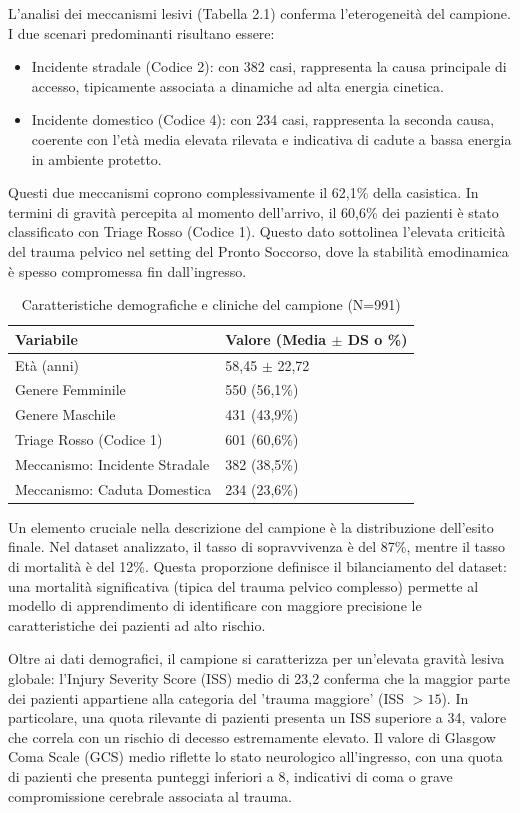\documentclass[11pt, oneside, noexaminfo]{sapthesis}   	%
\begin{document}
L’analisi dei meccanismi lesivi (Tabella 2.1) conferma l'eterogeneità del campione. I due scenari predominanti risultano essere:
\begin{itemize}
\item {Incidente stradale (Codice 2)}: con 382 casi, rappresenta la causa principale di accesso, tipicamente associata a dinamiche ad alta energia cinetica.
\item {Incidente domestico (Codice 4)}: con 234 casi, rappresenta la seconda causa, coerente con l'età media elevata rilevata e indicativa di cadute a bassa energia in ambiente protetto.
\end{itemize}

Questi due meccanismi coprono complessivamente il 62,1\% della casistica. In termini di gravità percepita al momento dell'arrivo, il 60,6\% dei pazienti è stato classificato con Triage Rosso (Codice 1). Questo dato sottolinea l'elevata criticità del trauma pelvico nel setting del Pronto Soccorso, dove la stabilità emodinamica è spesso compromessa fin dall'ingresso.

\begin{table}[h]
\centering
\caption{Caratteristiche demografiche e cliniche del campione (N=991)}
\begin{tabular}{ll}
\hline
\textbf{Variabile} & \textbf{Valore (Media $\pm$ DS o \%)} \\ \hline
Età (anni) & 58,45 $\pm$ 22,72 \\
Genere Femminile & 550 (56,1\%) \\
Genere Maschile & 431 (43,9\%) \\
Triage Rosso (Codice 1) & 601 (60,6\%) \\
Meccanismo: Incidente Stradale & 382 (38,5\%) \\
Meccanismo: Caduta Domestica & 234 (23,6\%) \\ \hline
\end{tabular}
\end{table}

Un elemento cruciale nella descrizione del campione è la distribuzione dell'esito finale. Nel dataset analizzato, il tasso di sopravvivenza è del 87\%, mentre il tasso di mortalità è del 12\%. Questa proporzione definisce il bilanciamento del dataset: una mortalità significativa (tipica del trauma pelvico complesso) permette al modello di apprendimento di identificare con maggiore precisione le caratteristiche dei pazienti ad alto rischio.

Oltre ai dati demografici, il campione si caratterizza per un'elevata gravità lesiva globale: l'Injury Severity Score (ISS) medio di 23,2 conferma che la maggior parte dei pazienti appartiene alla categoria del 'trauma maggiore' (ISS $> 15$). In particolare, una quota rilevante di pazienti presenta un ISS superiore a 34, valore che correla con un rischio di decesso estremamente elevato. Il valore di Glasgow Coma Scale (GCS) medio riflette lo stato neurologico all'ingresso, con una quota di pazienti che presenta punteggi inferiori a 8, indicativi di coma o grave compromissione cerebrale associata al trauma.
\end{document}
